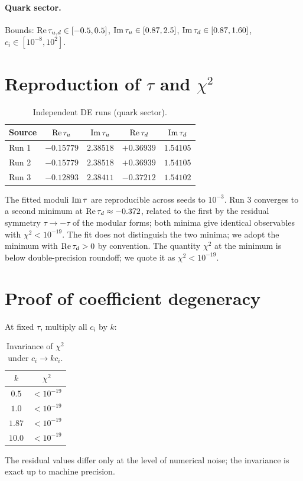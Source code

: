 \documentclass[12pt,a4paper]{article}
\numberwithin{equation}{section}
\begin{document}
\paragraph{Quark sector.} Bounds: \({\rm Re}\,\tau_{u,d}\in[-0.5,0.5]\), \({\rm Im}\,\tau_u\in[0.87,2.5]\), \({\rm Im}\,\tau_d\in[0.87,1.60]\), \(c_i\in[10^{-8},10^2]\).

\section{Reproduction of \(\tau\) and \(\chi^2\)}
\begin{table}[H]
\centering
\caption{Independent DE runs (quark sector).}
\begin{tabular}{lcccc}
\toprule
Source & \({\rm Re}\,\tau_u\) & \({\rm Im}\,\tau_u\) & \({\rm Re}\,\tau_d\) & \({\rm Im}\,\tau_d\) \\
\midrule
Run 1 & \(-0.15779\) & \(2.38518\) & \(+0.36939\) & \(1.54105\) \\
Run 2 & \(-0.15779\) & \(2.38518\) & \(+0.36939\) & \(1.54105\) \\
Run 3 & \(-0.12893\) & \(2.38411\) & \(-0.37212\) & \(1.54102\) \\
\bottomrule
\end{tabular}
\end{table}
The fitted moduli \({\rm Im}\,\tau\) are reproducible across seeds to \(10^{-3}\). Run 3 converges to a second minimum at \({\rm Re}\,\tau_d \approx -0.372\), related to the first by the residual symmetry \(\tau \to -\tau\) of the modular forms; both minima give identical observables with \(\chi^2 < 10^{-19}\). The fit does not distinguish the two minima; we adopt the minimum with \({\rm Re}\,\tau_d > 0\) by convention. The quantity \(\chi^2\) at the minimum is below double-precision roundoff; we quote it as \(\chi^2<10^{-19}\).

\section{Proof of coefficient degeneracy}
At fixed \(\tau\), multiply all \(c_i\) by \(k\):
\begin{table}[H]
\centering
\caption{Invariance of \(\chi^2\) under \(c_i\to kc_i\).}
\begin{tabular}{cc}
\toprule
\(k\) & \(\chi^2\) \\
\midrule
\(0.5\)  & \(< 10^{-19}\) \\
\(1.0\)  & \(< 10^{-19}\) \\
\(1.87\) & \(< 10^{-19}\) \\
\(10.0\) & \(< 10^{-19}\) \\
\bottomrule
\end{tabular}
\end{table}
The residual values differ only at the level of numerical noise; the invariance is exact up to machine precision.
\end{document}
